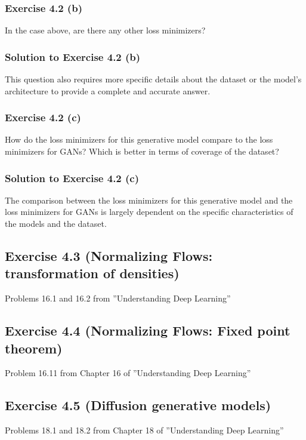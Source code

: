\documentclass[
10pt, %
a4paper, %
oneside, %
headinclude,footinclude, %
BCOR5mm, %
]{scrartcl}
\begin{document}
\subsubsection*{Exercise 4.2 (b)}
In the case above, are there any other loss minimizers?

\subsubsection*{Solution to Exercise 4.2 (b)}
This question also requires more specific details about the dataset or the model's architecture to provide a complete and accurate answer.

\subsubsection*{Exercise 4.2 (c)}
How do the loss minimizers for this generative model compare to the loss minimizers for GANs? Which is better in terms of coverage of the dataset?

\subsubsection*{Solution to Exercise 4.2 (c)}
The comparison between the loss minimizers for this generative model and the loss minimizers for GANs is largely dependent on the specific characteristics of the models and the dataset.

\subsection*{Exercise 4.3 (Normalizing Flows: transformation of densities)}
Problems 16.1 and 16.2 from ”Understanding Deep Learning”

\subsection*{Exercise 4.4 (Normalizing Flows: Fixed point theorem)}
Problem 16.11 from Chapter 16 of ”Understanding Deep Learning”

\subsection*{Exercise 4.5 (Diffusion generative models)}
Problems 18.1 and 18.2 from Chapter 18 of ”Understanding Deep Learning”


\end{document}
